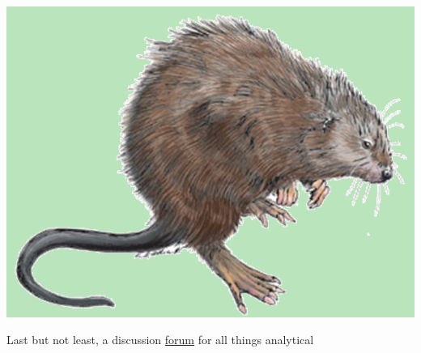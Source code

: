\documentclass[serif]{beamer}\usepackage[]{graphicx}\usepackage[]{color}
\begin{document}
\begin{frame}[t, fragile]{\includegraphics[width=0.05\paperwidth]{fig/muskrat.png}\hspace{0.07in}{\bf SWMPrats.net: Forum}}
\centerline{Last but not least, a discussion \href{http://swmprats.net/forum}{forum} for all things analytical}
\vspace{0.1in}
\centerline{}
\end{frame}
\end{document}
